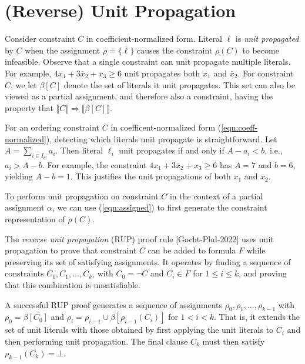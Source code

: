 \documentclass{easychair}
\newcommand{\boolnot}{\neg}
\newcommand{\nil}{\bot}
\renewcommand{\obar}[1]{\overline{#1}}
\newcommand{\lit}{\ell}
\newcommand{\assign}{\rho}
\newcommand{\indices}{I}
\newcommand{\uprop}[1]{\beta[#1]}
\newcommand{\imply}{\Rightarrow}
\newcommand{\func}[1]{\llbracket#1\rrbracket}
\begin{document}
\section{(Reverse) Unit Propagation}

Consider constraint $C$ in coefficient-normalized form.  Literal
$\lit$ is {\em unit propagated} by $C$ when the assignment $\assign = \{ \obar{\lit} \}$
causes the constraint $\assign(C)$ to become infeasible.
Observe that
a single constraint can unit propagate multiple literals.  For
example, $4 x_1 + 3 \obar{x}_2 + x_3 \geq 6$ unit propagates both
$x_1$ and $\obar{x}_2$.  For constraint $C$, we let $\uprop{C}$
denote the set of literals it unit propagates.  This set can also be
viewed as a partial assignment, and therefore also a constraint,
having the property that $\func{C} \imply \func{\uprop{C}}$.

For an ordering constraint $C$ in coefficent-normalized form (\ref{eqn:coeff-normalized}), detecting
which literals unit propagate is straightforward.  Let $A =
\sum_{i \in \indices_C} a_{i}$.  Then literal $\lit_{i}$ unit propagates if and only
if $A - a_{i} < b$, i.e., $a_{i} > A - b$.  For example, the constraint 
$4 x_1 + 3 \obar{x}_2 + x_3 \geq 6$ has $A = 7$ and $b=6$, yielding $A-b=1$.
This justifies the unit propagations of both $x_1$ and $\obar{x}_2$.

To perform unit propagation on constraint $C$ in the context of a
partial assignment $\alpha$, we can use (\ref{eqn:assigned}) to first
generate the constraint representation of $\assign(C)$.

The {\em reverse unit propagation} (RUP) proof rule [Gocht-Phd-2022] uses
unit propagation to prove that constraint $C$ can be added to 
formula $F$ while preserving its set of satisfying assignments.  It
operates by finding a sequence of constraints $C_0, C_1, \ldots, C_k$,
with $C_0 = \boolnot C$ and $C_i \in F$ for $1 \leq i \leq k$, and proving that this combination is unsatisfiable.

A successful RUP proof generates a sequence of assignments
$\assign_0, \assign_1, \ldots, \assign_{k-1}$ with $\assign_0 = \uprop{C_0}$
and
$\assign_i = \assign_{i-1} \cup \uprop{\assign_{i-1}(C_i)}$
for $1 < i < k$.
That is, it extends the set of unit literals with those obtained by first applying the unit literals to $C_i$ and then performing unit propagation.
The final clause $C_k$ must then satisfy $\assign_{k-1}(C_k) = \nil$.
\end{document}
